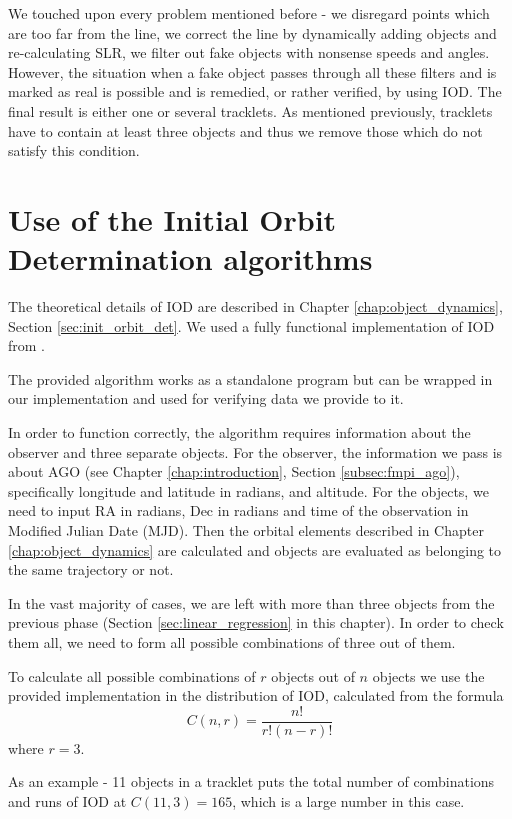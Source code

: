 	We touched upon every problem mentioned before - we disregard points which are too far from the line, we correct the line by dynamically adding objects and re-calculating SLR, we filter out fake objects with nonsense speeds and angles. However, the situation when a fake object passes through all these filters and is marked as real is possible and is remedied, or rather verified, by using IOD. The final result is either one or several tracklets. As mentioned previously, tracklets have to contain at least three objects and thus we remove those which do not satisfy this condition.

\section{Use of the Initial Orbit Determination algorithms}\label{sec:IDO}

	The theoretical details of IOD are described in Chapter \ref{chap:object_dynamics}, Section \ref{sec:init_orbit_det}. We used a fully functional implementation of IOD from \citep{Silha2012id}.

	The provided algorithm works as a standalone program but can be wrapped in our implementation and used for verifying data we provide to it.
	
	 In order to function correctly, the algorithm requires information about the observer and three separate objects. For the observer, the information we pass is about AGO (see Chapter \ref{chap:introduction}, Section \ref{subsec:fmpi_ago}), specifically longitude and latitude in radians, and altitude. For the objects, we need to input RA in radians, Dec in radians and time of the observation in Modified Julian Date (MJD). Then the orbital elements described in Chapter \ref{chap:object_dynamics} are calculated and objects are evaluated as belonging to the same trajectory or not.
	 
	 In the vast majority of cases, we are left with more than three objects from the previous phase (Section \ref{sec:linear_regression} in this chapter). In order to check them all, we need to form all possible combinations of three out of them. 
	 	
	 To calculate all possible combinations of $r$ objects out of $n$ objects we use the provided implementation in the distribution of IOD, calculated from the formula $$C(n,r)=\frac{n!}{r!(n-r)!}$$ where $r=3$.
	 
	 As an example - 11 objects in a tracklet puts the total number of combinations and runs of IOD at $C(11,3)=165$, which is a large number in this case. 
	 

